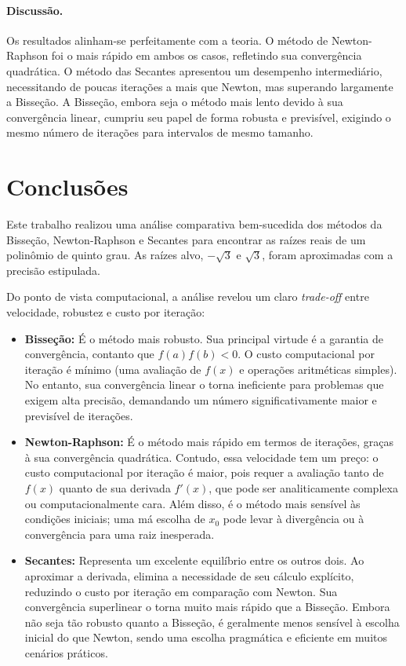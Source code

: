 \documentclass[12pt,a4paper]{article}
\begin{document}
\paragraph{Discussão.}
Os resultados alinham-se perfeitamente com a teoria. O método de Newton-Raphson foi o mais rápido em ambos os casos, refletindo sua convergência quadrática. O método das Secantes apresentou um desempenho intermediário, necessitando de poucas iterações a mais que Newton, mas superando largamente a Bisseção. A Bisseção, embora seja o método mais lento devido à sua convergência linear, cumpriu seu papel de forma robusta e previsível, exigindo o mesmo número de iterações para intervalos de mesmo tamanho.

\section{Conclusões}
Este trabalho realizou uma análise comparativa bem-sucedida dos métodos da Bisseção, Newton-Raphson e Secantes para encontrar as raízes reais de um polinômio de quinto grau. As raízes alvo, $-\sqrt{3}$ e $\sqrt{3}$, foram aproximadas com a precisão estipulada.

Do ponto de vista computacional, a análise revelou um claro \emph{trade-off} entre velocidade, robustez e custo por iteração:

\begin{itemize}
    \item \textbf{Bisseção:} É o método mais robusto. Sua principal virtude é a garantia de convergência, contanto que $f(a)f(b)<0$. O custo computacional por iteração é mínimo (uma avaliação de $f(x)$ e operações aritméticas simples). No entanto, sua convergência linear o torna ineficiente para problemas que exigem alta precisão, demandando um número significativamente maior e previsível de iterações.

    \item \textbf{Newton-Raphson:} É o método mais rápido em termos de iterações, graças à sua convergência quadrática. Contudo, essa velocidade tem um preço: o custo computacional por iteração é maior, pois requer a avaliação tanto de $f(x)$ quanto de sua derivada $f'(x)$, que pode ser analiticamente complexa ou computacionalmente cara. Além disso, é o método mais sensível às condições iniciais; uma má escolha de $x_0$ pode levar à divergência ou à convergência para uma raiz inesperada.

    \item \textbf{Secantes:} Representa um excelente equilíbrio entre os outros dois. Ao aproximar a derivada, elimina a necessidade de seu cálculo explícito, reduzindo o custo por iteração em comparação com Newton. Sua convergência superlinear o torna muito mais rápido que a Bisseção. Embora não seja tão robusto quanto a Bisseção, é geralmente menos sensível à escolha inicial do que Newton, sendo uma escolha pragmática e eficiente em muitos cenários práticos.
\end{itemize}
\end{document}
